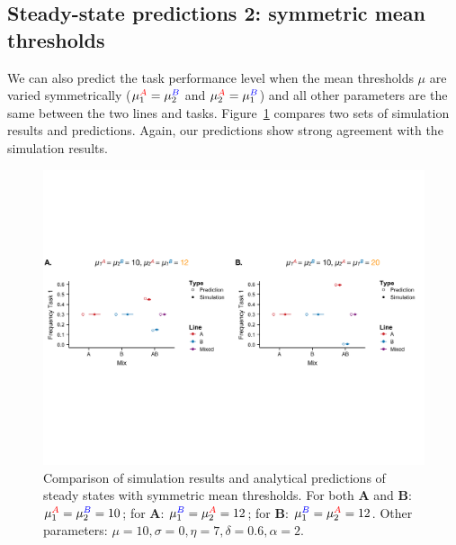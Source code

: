 \documentclass[11pt]{article}
\newcommand{\A}{{\color{red}A}}
\newcommand{\B}{{\color{blue}B}}
\newcommand{\later}{{\color{red}(Add later)}}
\begin{document}
\subsection{Steady-state predictions 2: symmetric mean thresholds} \label{sec:sspred2}
We can also predict the task performance level when the mean thresholds $\mu$ are varied symmetrically ($\mu_{1}^{\A} = \mu_{2}^{\B}$ and $\mu_{2}^{\A} = \mu_{1}^{\B}$) and all other parameters are the same between the two lines and tasks. Figure~\ref{fig:5050_comp_mu} compares two sets of simulation results and predictions. Again, our predictions show strong agreement with the simulation results.
\begin{figure}[H]
    \centering
    \includegraphics[trim={0 2.6in 0 2.5in}, clip, width=1\linewidth]{./model_comparison_mu.pdf}
    \caption{Comparison of simulation results and analytical predictions of steady states
    with symmetric mean thresholds. For both \textbf{A} and \textbf{B}: $\mu_1^{\A} = \mu_2^{\B} = 10$; for \textbf{A}: $\mu_1^{\B} = \mu_2^{\A} = 12$; for \textbf{B}: $\mu_1^{\B} = \mu_2^{\A} = 12$. Other parameters: $\mu = 10, \sigma = 0, \eta = 7, \delta = 0.6, \alpha = 2$. }
    \label{fig:5050_comp_mu}
\end{figure}


\end{document}
